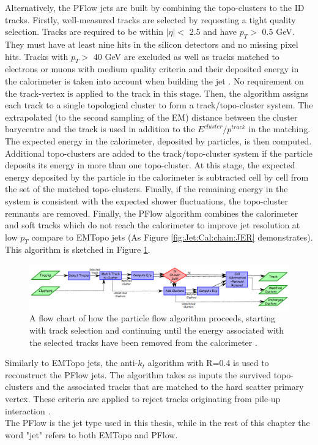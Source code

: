 Alternatively, the PFlow jets are built by combining the topo-clusters to the ID tracks. Firstly, well-measured tracks are selected by requesting a tight quality selection. Tracks are required to be within $|\eta|<$ 2.5 and have $p_T>$ 0.5 GeV. They must have at least nine hits in the silicon detectors and no missing pixel hits. Tracks with $p_T>$ 40 GeV are excluded as well as tracks matched to electrons or muons with medium quality criteria and their deposited energy in the calorimeter is taken into account when building the jet \cite{PFlow_Reco}. No requirement on the track-vertex is applied to the track in this stage. Then, the algorithm assigns each track to a single topological cluster to form a track/topo-cluster system. The extrapolated (to the second sampling of the EM) distance between the cluster barycentre and the track is used in addition to the $E^{cluster}/p^{track}$ in the matching. The expected energy in the calorimeter, deposited by particles, is then computed. Additional topo-clusters are added to the track/topo-cluster system if the particle deposits its energy in more than one topo-cluster. At this stage, the expected energy deposited by the particle in the calorimeter is subtracted cell by cell from the set of the matched topo-clusters. Finally, if the remaining energy in the system is consistent with the expected shower fluctuations, the topo-cluster remnants are removed. Finally, the PFlow algorithm combines the calorimeter and soft tracks which do not reach the calorimeter to improve jet resolution at low $p_T$ compare to EMTopo jets (As Figure \ref{fig:Jet:Cal:chain:JER} demonstrates). This algorithm is sketched in Figure \ref{fig:Jet:JR:PFlowSketch}. 

\begin{figure}[htbp]
    \centering
    \includegraphics[width=1.\textwidth]{Ch4/Img/PFlow_Algo.png}
    \caption{A flow chart of how the particle flow algorithm proceeds, starting with track selection and continuing until the energy associated with the selected tracks have been removed from the calorimeter \cite{PFlow_Reco}.}
    \label{fig:Jet:JR:PFlowSketch}
\end{figure}
Similarly to EMTopo jets, the anti-$k_t$ algorithm with R=0.4 is used to reconstruct the PFlow jets. The algorithm takes as inputs the survived topo-clusters and the associated tracks that are matched to the hard scatter primary vertex. These criteria are applied to reject tracks originating from pile-up interaction \cite{Jet_pileUp}. \\
The PFlow is the jet type used in this thesis, while in the rest of this chapter the word "jet" refers to both EMTopo and PFlow.

